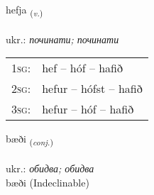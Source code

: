 \documentclass[frontgrid, backgrid]{flacards}\usepackage[]{graphicx}\usepackage[]{xcolor}
\begin{document}
\renewcommand{\flhead}{\vskip5pt \fboxsep=0pt {\small\bfseries\footnotesize Sagnorð | дієслово}}
\renewcommand{\fcfoot}{\vskip5pt \fboxsep=0pt \hspace{2pt}{\small\bfseries\footnotesize 1K}}

\renewcommand{\blhead}{\vskip5pt {\small\bfseries\footnotesize Sagnorð | дієслово }}
\renewcommand{\bcfoot}{\vskip5pt \hspace{2pt}{\small\bfseries\footnotesize 1K}}


{hefja \small{\textsubscript{(\textit{v.})}} \\[1ex] %
\textphonetic{[hɛvja]} \\
ukr.: \emph{починати; починати} \\  [2ex]
\renewcommand*{\arraystretch}{0.8}
\begin{tabular}{p{1cm}l}
\textsc{1sg}: & hef -- hóf -- hafið \\ 
\textsc{2sg}: & hefur -- hófst -- hafið \\ 
\textsc{3sg}: & hefur -- hóf -- hafið \\ 
\end{tabular}
}


\renewcommand{\flhead}{\vskip5pt \fboxsep=0pt {\small\bfseries\footnotesize Samtenging | сполучник}}
\renewcommand{\fcfoot}{\vskip5pt \fboxsep=0pt \hspace{2pt}{\small\bfseries\footnotesize 1K}}

\renewcommand{\blhead}{\vskip5pt {\small\bfseries\footnotesize Samtenging | сполучник }}
\renewcommand{\bcfoot}{\vskip5pt \hspace{2pt}{\small\bfseries\footnotesize 1K}}


{bæði \small{\textsubscript{(\textit{conj.})}} \\[1ex]
\textphonetic{[paiːðɪ]} \\
ukr.: \emph{обидва; обидва} \\  [2ex]
bæði (Indeclinable)}

\end{document}
